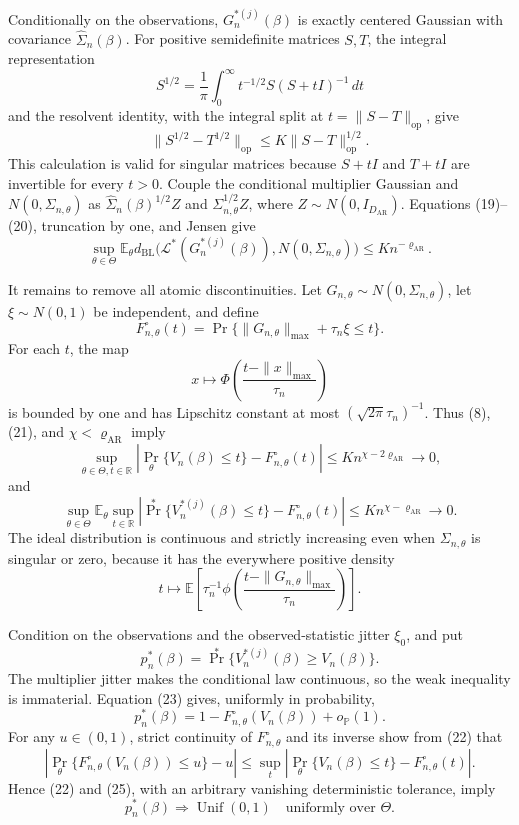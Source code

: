 Conditionally on the observations, \(G_n^{*(j)}(\beta)\) is exactly centered Gaussian with covariance \(\widehat\Sigma_n(\beta)\).  For positive semidefinite matrices \(S,T\), the integral representation
\[
 S^{1/2}=\frac1\pi\int_0^\infty t^{-1/2}S(S+tI)^{-1}\,dt
\]
and the resolvent identity, with the integral split at
\(t=\|S-T\|_{\mathrm{op}}\), give
\[
 \|S^{1/2}-T^{1/2}\|_{\mathrm{op}}
 \leq K\|S-T\|_{\mathrm{op}}^{1/2}. \tag{20}
\]
This calculation is valid for singular matrices because \(S+tI\) and \(T+tI\) are invertible for every \(t>0\).  Couple the conditional multiplier Gaussian and \(N(0,\Sigma_{n,\theta})\) as
\(\widehat\Sigma_n(\beta)^{1/2}Z\) and
\(\Sigma_{n,\theta}^{1/2}Z\), where \(Z\sim N(0,I_{D_{\mathrm{AR}}})\).  Equations (19)--(20), truncation by one, and Jensen give
\[
 \sup_{\theta\in\Theta}\mathbb E_\theta
 d_{\mathrm{BL}}\bigl(\mathcal L^*(G_n^{*(j)}(\beta)),
 N(0,\Sigma_{n,\theta})\bigr)
 \leq K n^{-\varrho_{\mathrm{AR}}}. \tag{21}
\]

It remains to remove all atomic discontinuities.  Let
\(G_{n,\theta}\sim N(0,\Sigma_{n,\theta})\), let
\(\xi\sim N(0,1)\) be independent, and define
\[
 F_{n,\theta}^{\circ}(t)
 =\Pr\{\|G_{n,\theta}\|_{\max}+\tau_n\xi\leq t\}.
\]
For each \(t\), the map
\[
 x\longmapsto
 \Phi\!\left(\frac{t-\|x\|_{\max}}{\tau_n}\right)
\]
is bounded by one and has Lipschitz constant at most
\((\sqrt{2\pi}\tau_n)^{-1}\).  Thus (8), (21), and
\(\chi<\varrho_{\mathrm{AR}}\) imply
\[
 \sup_{\theta\in\Theta,t\in\mathbb R}
 \left|\Pr_\theta\{V_n(\beta)\leq t\}
 -F_{n,\theta}^{\circ}(t)\right|
 \leq K n^{\chi-2\varrho_{\mathrm{AR}}}\longrightarrow0, \tag{22}
\]
and
\[
 \sup_{\theta\in\Theta}\mathbb E_\theta\sup_{t\in\mathbb R}
 \left|\Pr^*\{V_n^{*(j)}(\beta)\leq t\}
 -F_{n,\theta}^{\circ}(t)\right|
 \leq K n^{\chi-\varrho_{\mathrm{AR}}}\longrightarrow0. \tag{23}
\]
The ideal distribution is continuous and strictly increasing even when
\(\Sigma_{n,\theta}\) is singular or zero, because it has the everywhere positive density
\[
 t\longmapsto
 \mathbb E\!\left[\tau_n^{-1}\phi\!\left(
 \frac{t-\|G_{n,\theta}\|_{\max}}{\tau_n}\right)\right]. \tag{24}
\]

Condition on the observations and the observed-statistic jitter \(\xi_0\), and put
\[
 p_n^*(\beta)=\Pr^*\{V_n^{*(j)}(\beta)\geq V_n(\beta)\}.
\]
The multiplier jitter makes the conditional law continuous, so the weak inequality is immaterial.  Equation (23) gives, uniformly in probability,
\[
 p_n^*(\beta)
 =1-F_{n,\theta}^{\circ}(V_n(\beta))+o_{\mathbb P}(1). \tag{25}
\]
For any \(u\in(0,1)\), strict continuity of \(F_{n,\theta}^{\circ}\) and its inverse show from (22) that
\[
 \left|\Pr_\theta\{F_{n,\theta}^{\circ}(V_n(\beta))\leq u\}-u\right|
 \leq
 \sup_t\left|\Pr_\theta\{V_n(\beta)\leq t\}
                  -F_{n,\theta}^{\circ}(t)\right|.
\]
Hence (22) and (25), with an arbitrary vanishing deterministic tolerance, imply
\[
 p_n^*(\beta)\Longrightarrow\operatorname{Unif}(0,1)
 \quad\text{uniformly over }\Theta. \tag{26}
\]

